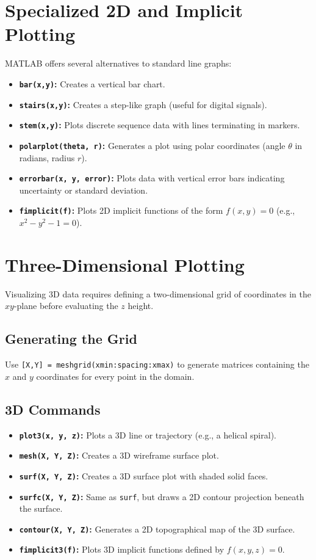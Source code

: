 \section{Specialized 2D and Implicit Plotting}
MATLAB offers several alternatives to standard line graphs:
\begin{itemize}
    \item \textbf{\texttt{bar(x,y)}:} Creates a vertical bar chart.
    \item \textbf{\texttt{stairs(x,y)}:} Creates a step-like graph (useful for digital signals).
    \item \textbf{\texttt{stem(x,y)}:} Plots discrete sequence data with lines terminating in markers.
    \item \textbf{\texttt{polarplot(theta, r)}:} Generates a plot using polar coordinates (angle $\theta$ in radians, radius $r$).
    \item \textbf{\texttt{errorbar(x, y, error)}:} Plots data with vertical error bars indicating uncertainty or standard deviation.
    \item \textbf{\texttt{fimplicit(f)}:} Plots 2D implicit functions of the form $f(x,y) = 0$ (e.g., $x^2 - y^2 - 1 = 0$).
\end{itemize}

\section{Three-Dimensional Plotting}
Visualizing 3D data requires defining a two-dimensional grid of coordinates in the $xy$-plane before evaluating the $z$ height.

\subsection{Generating the Grid}
Use \texttt{[X,Y] = meshgrid(xmin:spacing:xmax)} to generate matrices containing the $x$ and $y$ coordinates for every point in the domain.

\subsection{3D Commands}
\begin{itemize}
    \item \textbf{\texttt{plot3(x, y, z)}:} Plots a 3D line or trajectory (e.g., a helical spiral).
    \item \textbf{\texttt{mesh(X, Y, Z)}:} Creates a 3D wireframe surface plot.
    \item \textbf{\texttt{surf(X, Y, Z)}:} Creates a 3D surface plot with shaded solid faces.
    \item \textbf{\texttt{surfc(X, Y, Z)}:} Same as \texttt{surf}, but draws a 2D contour projection beneath the surface.
    \item \textbf{\texttt{contour(X, Y, Z)}:} Generates a 2D topographical map of the 3D surface.
    \item \textbf{\texttt{fimplicit3(f)}:} Plots 3D implicit functions defined by $f(x,y,z) = 0$.
\end{itemize}

